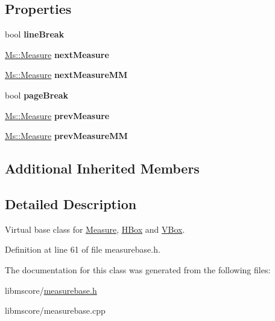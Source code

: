 \subsection*{Properties}
\begin{DoxyCompactItemize}
\item 
\mbox{\label{class_ms_1_1_measure_base_a467f22f422580ce5b696befee5d93202}} 
bool {\bfseries line\+Break}
\item 
\mbox{\label{class_ms_1_1_measure_base_afb64aa0b1d63065b631e6040e8ab8dbc}} 
\hyperlink{class_ms_1_1_measure}{Ms\+::\+Measure} {\bfseries next\+Measure}
\item 
\mbox{\label{class_ms_1_1_measure_base_a24f05993bfe189c66e985787ed4c8961}} 
\hyperlink{class_ms_1_1_measure}{Ms\+::\+Measure} {\bfseries next\+Measure\+MM}
\item 
\mbox{\label{class_ms_1_1_measure_base_a181ff4e6ba590a021f6bd9a9410dabdf}} 
bool {\bfseries page\+Break}
\item 
\mbox{\label{class_ms_1_1_measure_base_ac7c91912ce987f58fc4ccd6b1c7d2b12}} 
\hyperlink{class_ms_1_1_measure}{Ms\+::\+Measure} {\bfseries prev\+Measure}
\item 
\mbox{\label{class_ms_1_1_measure_base_a8594f30fd884a56a63789b59152757fb}} 
\hyperlink{class_ms_1_1_measure}{Ms\+::\+Measure} {\bfseries prev\+Measure\+MM}
\end{DoxyCompactItemize}
\subsection*{Additional Inherited Members}


\subsection{Detailed Description}
Virtual base class for \hyperlink{class_ms_1_1_measure}{Measure}, \hyperlink{class_ms_1_1_h_box}{H\+Box} and \hyperlink{class_ms_1_1_v_box}{V\+Box}. 

Definition at line 61 of file measurebase.\+h.



The documentation for this class was generated from the following files\+:\begin{DoxyCompactItemize}
\item 
libmscore/\hyperlink{measurebase_8h}{measurebase.\+h}\item 
libmscore/measurebase.\+cpp\end{DoxyCompactItemize}

